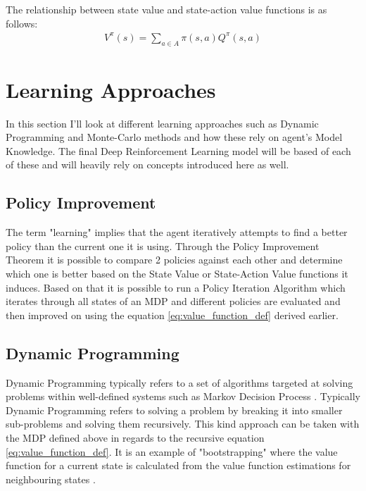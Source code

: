 The relationship between state value and state-action value functions is as follows:
\begin{align}
    V^{\pi}(s) = \sum_{a \in A} \pi(s, a) Q^{\pi}(s, a) 
\end{align}


\section{Learning Approaches}

In this section I'll look at different learning approaches such
as Dynamic Programming and Monte-Carlo methods and how 
these rely on agent's Model Knowledge. The final Deep Reinforcement Learning model will be based of each of these 
and will heavily rely on concepts introduced here as well. 

\subsection{Policy Improvement}

The term "learning" implies that the agent iteratively attempts 
to find a better policy than the current one it is using. 
Through the Policy Improvement Theorem \cite{lecture_dp} it is 
possible to compare 2 policies against each other and determine
which one is better based on the State Value or State-Action
Value functions it induces. Based on that it is possible to run a
Policy Iteration Algorithm \cite{lecture_dp} which iterates
through all states of an MDP and different policies are evaluated and then improved on using the equation \ref{eq:value_function_def} derived earlier.

\subsection{Dynamic Programming}

Dynamic Programming typically refers to a set of algorithms targeted at solving problems within well-defined systems such as Markov Decision Process \cite{lecture_dp}. Typically Dynamic Programming refers to solving a problem by breaking it into smaller sub-problems and solving them recursively. This kind
approach can be taken with the MDP defined above in regards to 
the recursive equation \ref{eq:value_function_def}. It is an
example of "bootstrapping" where the value function
for a current state is calculated from the value function 
estimations for neighbouring states \cite{lecture_dp}. \\

